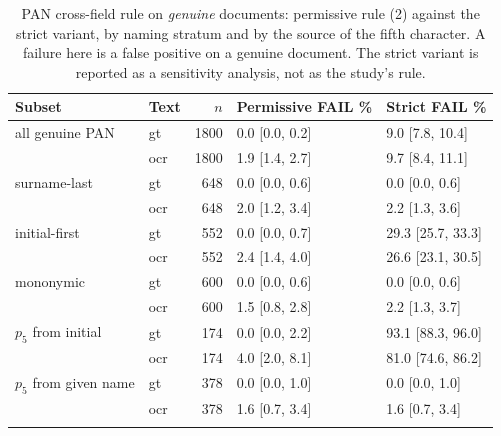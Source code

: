 \begin{table}[t]
\caption{PAN cross-field rule on \emph{genuine} documents:
permissive rule (2) against the strict variant, by naming stratum and
by the source of the fifth character. A failure here is a false
positive on a genuine document. The strict variant is reported as a
sensitivity analysis, not as the study's rule.}
\label{tab:permstrict}
\centering
\scriptsize
\setlength{\tabcolsep}{3.5pt}
\begin{tabular}{@{}llrll@{}}
\toprule
Subset & Text & $n$ & Permissive FAIL \% & Strict FAIL \% \\
\midrule
all genuine PAN & gt & 1800 & 0.0 [0.0, 0.2] & 9.0 [7.8, 10.4] \\
 & ocr & 1800 & 1.9 [1.4, 2.7] & 9.7 [8.4, 11.1] \\
\addlinespace[1.5pt]
surname-last & gt & 648 & 0.0 [0.0, 0.6] & 0.0 [0.0, 0.6] \\
 & ocr & 648 & 2.0 [1.2, 3.4] & 2.2 [1.3, 3.6] \\
\addlinespace[1.5pt]
initial-first & gt & 552 & 0.0 [0.0, 0.7] & 29.3 [25.7, 33.3] \\
 & ocr & 552 & 2.4 [1.4, 4.0] & 26.6 [23.1, 30.5] \\
\addlinespace[1.5pt]
mononymic & gt & 600 & 0.0 [0.0, 0.6] & 0.0 [0.0, 0.6] \\
 & ocr & 600 & 1.5 [0.8, 2.8] & 2.2 [1.3, 3.7] \\
\addlinespace[1.5pt]
$p_5$ from initial & gt & 174 & 0.0 [0.0, 2.2] & 93.1 [88.3, 96.0] \\
 & ocr & 174 & 4.0 [2.0, 8.1] & 81.0 [74.6, 86.2] \\
\addlinespace[1.5pt]
$p_5$ from given name & gt & 378 & 0.0 [0.0, 1.0] & 0.0 [0.0, 1.0] \\
 & ocr & 378 & 1.6 [0.7, 3.4] & 1.6 [0.7, 3.4] \\
\addlinespace[1.5pt]
\bottomrule
\end{tabular}
\end{table}
